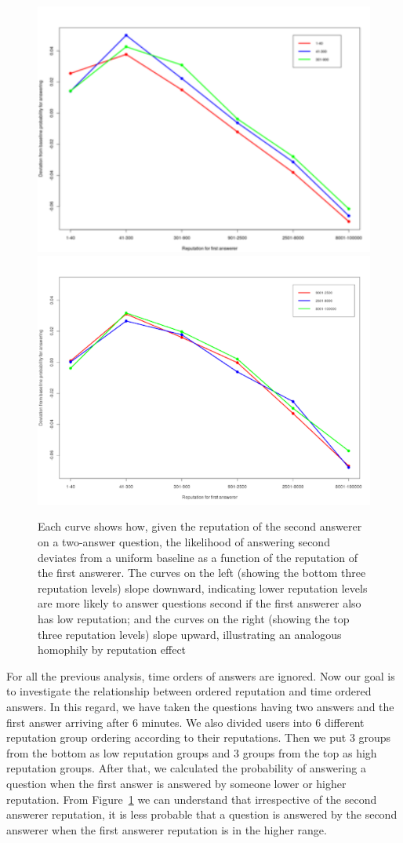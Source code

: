\begin{figure}[!t]
    \centering
    \includegraphics[width=0.7\columnwidth]{img/Fig4_2010_left.pdf}
    \includegraphics[width=0.7\columnwidth]{img/Fig4_2010_right.pdf}
    \caption{Each curve shows how, given the reputation of the second answerer on a two-answer question, the likelihood of answering second deviates from a uniform baseline as a function of the reputation of the first answerer. The curves on the left (showing the bottom three reputation levels) slope downward, indicating lower reputation levels are more likely to answer questions second if the first answerer also has low reputation; and the curves on the right (showing the top three reputation levels) slope upward, illustrating an analogous homophily by reputation effect}
    \label{fig:fig4_2010}
\end{figure}
For all the previous analysis, time orders of answers are ignored. Now our goal is to investigate the relationship between ordered reputation and time ordered answers. In this regard, we have taken the questions having two answers and the first answer arriving after 6 minutes. We also divided users into 6 different reputation group ordering according to their reputations. Then we put 3 groups from the bottom as low reputation groups and 3 groups from the top as high reputation groups. After that, we calculated the probability of answering a question when the first answer is answered by someone lower or higher reputation. From Figure~\ref{fig:fig4_2010} we can understand that irrespective of the second answerer reputation, it is less probable that a question is answered by the second answerer when the first answerer reputation is in the higher range.



